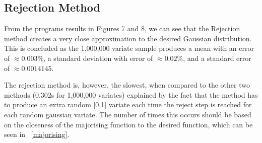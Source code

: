 \documentclass{article}
\newcommand{\figref}[2][\figurename~]{#1\ref{#2}}
\begin{document}
\begin{figure}[htb]
\end{figure}





\subsection{Rejection Method}

From the programs results in Figures 7 and 8, we can see that the Rejection method creates a very close approximation to the desired Gaussian distribution. This is concluded as the 1,000,000 variate sample produces a mean with an error of $\approx0.003\%$, a standard deviation with error of $\approx0.02\%$, and a standard error of $\approx0.0014145$.

The rejection method is, however, the slowest, when compared to the other two methods (0.302s for 1,000,000 variates) explained by the fact that the method has to produce an extra random [0,1] variate each time the reject step is reached for each random gaussian variate. The number of times this occurs should be based on the closeness of the majorising function to the desired function, which can be seen in \figref{majorising}.

\begin{figure}[htb]
\end{figure}
\end{document}
